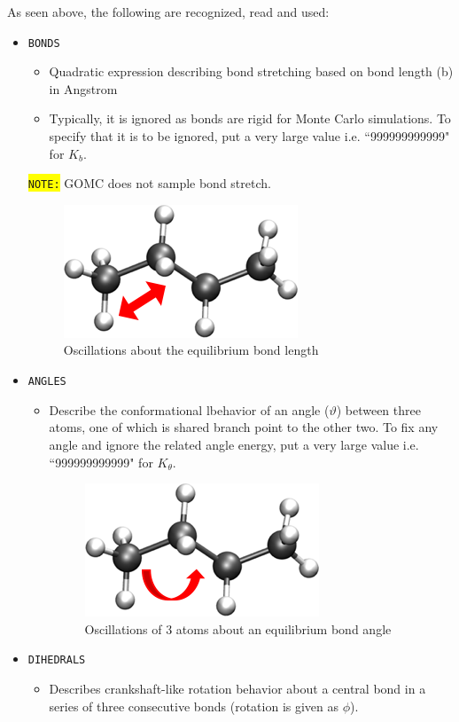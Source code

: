 As seen above, the following are recognized, read and used:
\begin{itemize}
\item \texttt{BONDS}
\begin{itemize}
\item Quadratic expression describing bond stretching based on bond length (b) in Angstrom
\item Typically, it is ignored as bonds are rigid for Monte Carlo simulations. To specify that it is to be ignored, put a very large value i.e. ``999999999999" for $K_b$.
\end{itemize}
\colorbox{yellow}{\texttt{NOTE:}} GOMC does not sample bond stretch.
\begin{figure}[H]
\centering
\includegraphics[scale=1.0]{images/bonds}
\caption{Oscillations about the equilibrium bond length}
\end{figure}
\item \texttt{ANGLES}
\begin{itemize}
\item Describe the conformational lbehavior of an angle ($\vartheta$) between three atoms, one of which is shared branch point to the other two. To fix any angle and ignore the related angle energy, put a very large value i.e. ``999999999999" for $K_{\theta}$.
\begin{figure}[H]
\centering
\includegraphics[scale=1.0]{images/angle}
\caption{Oscillations of 3 atoms about an equilibrium bond angle}
\end{figure}
\end{itemize}
\item \texttt{DIHEDRALS} 
\begin{itemize}
\item Describes crankshaft-like rotation behavior about a central bond in a series of three consecutive bonds (rotation is given as $\phi$).

\end{itemize}
\end{itemize}
